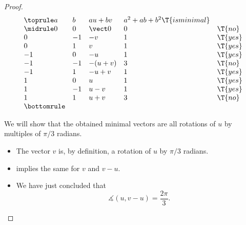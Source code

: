 \begin{proof}
  \begin{table}
    \begin{equation*}
      \begin{array}{*{5}{l}}
        \toprule
        a  & b  & au + bv  & a^2 + ab + b^2 \T{is minimal} \\
        \midrule
        0  & 0  & \vect 0  & 0            & \T{no}  \\
        0  & -1 & -v       & 1            & \T{yes} \\
        0  & 1  & v        & 1            & \T{yes} \\
        -1 & 0  & -u       & 1            & \T{yes} \\
        -1 & -1 & -(u + v) & 3            & \T{no}  \\
        -1 & 1  & -u + v   & 1            & \T{yes} \\
        1  & 0  & u        & 1            & \T{yes} \\
        1  & -1 & u - v    & 1            & \T{yes} \\
        1  & 1  & u + v    & 3            & \T{no}  \\
        \bottomrule
      \end{array}
    \end{equation*}
    \caption{All linear combinations of \( u \) and \( v \) satisfying \eqref{eq:thm:hexagonal_point_lattice_minimal_vectors/proof/eq_square} in our proof of \cref{thm:hexagonal_point_lattice_minimal_vectors}}\label{tab:thm:hexagonal_point_lattice_minimal_vectors/proof/eq_square}
  \end{table}

   We will show that the obtained minimal vectors are all rotations of \( u \) by multiples of \( \pi / 3 \) radians.

  \begin{itemize}
    \item The vector \( v \) is, by definition, a rotation of \( u \) by \( \pi / 3 \) radians.

    \item {} implies the same for \( v \) and \( v - u \).

    \item We have just concluded that
    \begin{equation*}
      \measuredangle(u, v - u) = \frac {2\pi} 3.
    \end{equation*}


\end{itemize}
\end{proof}
